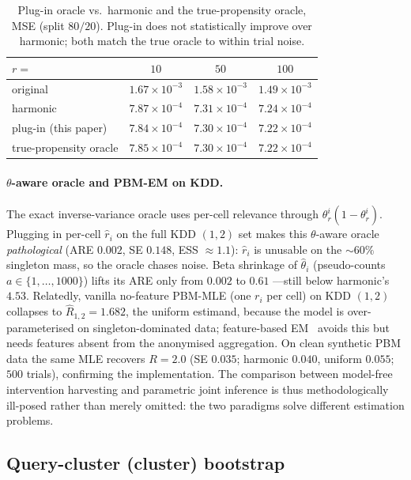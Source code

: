 \documentclass[11pt]{article}
\begin{document}
\begin{table}[h]
\centering
\caption{Plug-in oracle vs.\ harmonic and the true-propensity oracle,
MSE (split $80/20$). Plug-in does not statistically improve over
harmonic; both match the true oracle to within trial noise.}
\label{tab:plugin}
\begin{tabular}{lccc}
\toprule
$r=$ & $10$ & $50$ & $100$ \\
\midrule
original                & $1.67\times10^{-3}$ & $1.58\times10^{-3}$ & $1.49\times10^{-3}$ \\
harmonic                & $7.87\times10^{-4}$ & $7.31\times10^{-4}$ & $7.24\times10^{-4}$ \\
plug-in (this paper)    & $7.84\times10^{-4}$ & $7.30\times10^{-4}$ & $7.22\times10^{-4}$ \\
true-propensity oracle  & $7.85\times10^{-4}$ & $7.30\times10^{-4}$ & $7.22\times10^{-4}$ \\
\bottomrule
\end{tabular}
\end{table}

\paragraph{$\theta$-aware oracle and PBM-EM on KDD.}
The exact inverse-variance oracle uses per-cell relevance through
$\theta_r^i(1-\theta_r^i)$. Plugging in per-cell $\hat r_i$ on the full
KDD $(1,2)$ set makes this $\theta$-aware oracle \emph{pathological}
(ARE $0.002$, SE $0.148$, ESS $\approx1.1$): $\hat r_i$ is unusable on
the $\sim\!60\%$ singleton mass, so the oracle chases noise. Beta
shrinkage of $\hat\theta_i$ (pseudo-counts $a\in\{1,\dots,1000\}$) lifts
its ARE only from $0.002$ to $0.61$ ---still below harmonic's $4.53$.
Relatedly, vanilla no-feature PBM-MLE (one $r_i$ per cell) on KDD
$(1,2)$ collapses to $\hat R_{1,2}=1.682$, the uniform estimand, because
the model is over-parameterised on singleton-dominated data;
feature-based EM~\cite{wang2018position} avoids this but needs features
absent from the anonymised aggregation. On clean synthetic PBM data the
same MLE recovers $R=2.0$ (SE $0.035$; harmonic $0.040$, uniform
$0.055$; $500$ trials), confirming the implementation. The comparison
between model-free intervention harvesting and parametric joint
inference is thus methodologically ill-posed rather than merely omitted:
the two paradigms solve different estimation problems.

\subsection{Query-cluster (cluster) bootstrap}
\label{sec:cluster}
\end{document}
